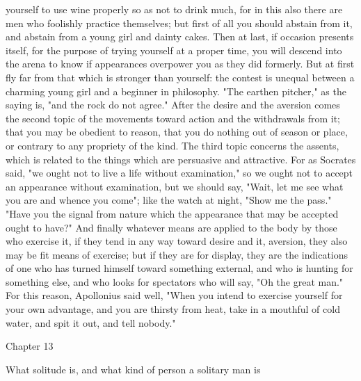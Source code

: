 \documentclass[a4paper]{article}
\begin{document}
yourself to use wine properly so as not to drink much, for in this also there
are men who foolishly practice themselves; but first of all you should abstain
from it, and abstain from a young girl and dainty cakes. Then at last, if
occasion presents itself, for the purpose of trying yourself at a proper time,
you will descend into the arena to know if appearances overpower you as they
did formerly. But at first fly far from that which is stronger than yourself:
the contest is unequal between a charming young girl and a beginner in
philosophy. "The earthen pitcher," as the saying is, "and the rock do not
agree."
    After the desire and the aversion comes the second topic of the movements
toward action and the withdrawals from it; that you may be obedient to reason,
that you do nothing out of season or place, or contrary to any propriety of the
kind. The third topic concerns the assents, which is related to the things
which are persuasive and attractive. For as Socrates said, "we ought not to
live a life without examination," so we ought not to accept an appearance
without examination, but we should say, "Wait, let me see what you are and
whence you come"; like the watch at night, "Show me the pass." "Have you the
signal from nature which the appearance that may be accepted ought to have?"
And finally whatever means are applied to the body by those who exercise it, if
they tend in any way toward desire and it, aversion, they also may be fit means
of exercise; but if they are for display, they are the indications of one who
has turned himself toward something external, and who is hunting for something
else, and who looks for spectators who will say, "Oh the great man." For this
reason, Apollonius said well, "When you intend to exercise yourself for your
own advantage, and you are thirsty from heat, take in a mouthful of cold water,
and spit it out, and tell nobody."

Chapter 13

What solitude is, and what kind of person a solitary man is
\end{document}
